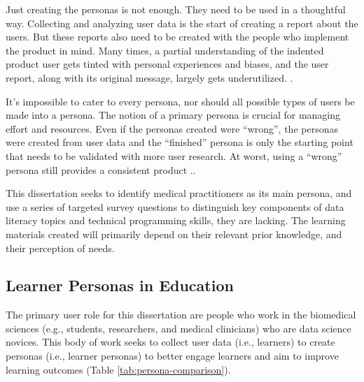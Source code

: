\documentclass[010-intro.tex]{subfiles}
\begin{document}
        Just creating the personas is not enough.
        They need to be used in a thoughtful way.
        Collecting and analyzing user data is the start of creating a report about the users.
        But these reports also need to be created with the people who implement the product in mind.
        Many times, a partial understanding of the indented product user gets
        tinted with personal experiences and biases,
        and the user report, along with its original message, largely gets underutilized.
        \cite{pruittPersonaLifecycleKeeping2006}.

        It's impossible to cater to every persona,
        nor should all possible types of users be made into a persona.
        The notion of a primary persona is crucial for managing effort and resources.
        Even if the personas created were ``wrong'',
        the personas were created from user data and the ``finished'' persona is only the starting point
        that needs to be validated with more user research.
        At worst, using a ``wrong'' persona still provides a consistent product
        \cite{pruittPersonaLifecycleKeeping2006}..

        This dissertation seeks to identify medical practitioners as its main persona,
        and use a series of targeted survey questions to distinguish key components
        of data literacy topics and technical programming skills, they are lacking.
        The learning materials created will primarily depend on their relevant prior knowledge,
        and their perception of needs.

\subsection{Learner Personas in Education}
\label{sse:intro-learner-personas}

    The primary user role for this dissertation are people who work in the biomedical sciences
    (e.g., students, researchers, and medical clinicians)
    who are data science novices.
    This body of work seeks to collect user data (i.e., learners) to create personas (i.e., learner personas)
    to better engage learners and aim to improve learning outcomes (Table \ref{tab:persona-comparison}).
\end{document}
